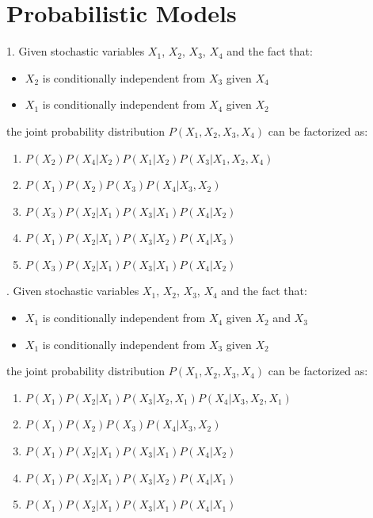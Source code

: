 \section{ Probabilistic Models}

1. Given stochastic variables $X_1$, $X_2$, $X_3$, $X_4$ and the fact that:

\begin{itemize}
    \item $X_2$ is conditionally independent from $X_3$ given $X_4$
    \item $X_1$ is conditionally independent from $X_4$ given $X_2$
\end{itemize}

\noindent the joint probability distribution $P(X_1, X_2, X_3, X_4)$ can be factorized as:
\begin{enumerate}[label=\roman*]
    \item $P(X_2)P(X_4 | X_2)P(X_1 | X_2) P(X_3 | X_1, X_2, X_4)$
    \item $P(X_1) P(X_2) P(X_3) P(X_4 | X_3, X_2)$
    \item $P(X_3) P(X_2 | X_1) P(X_3 | X_1) P(X_4 | X_2)$
    \item $P(X_1) P(X_2 | X_1) P(X_3 | X_2) P(X_4 | X_3)$
    \item $P(X_3) P(X_2 | X_1) P(X_3 | X_1) P(X_4 | X_2)$
\end{enumerate}

\newpage

. Given stochastic variables $X_1$, $X_2$, $X_3$, $X_4$ and the fact that:

\begin{itemize}
    \item $X_1$ is conditionally independent from $X_4$ given $X_2$ and $X_3$
    \item $X_1$ is conditionally independent from $X_3$ given $X_2$
\end{itemize}

\noindent the joint probability distribution $P(X_1, X_2, X_3, X_4)$ can be factorized as:
\begin{enumerate}[label=\roman*]
    \item $P(X_1)P(X_2 | X_1)P(X_3 | X_2, X_1) P(X_4 | X_3, X_2, X_1)$
    \item $P(X_1) P(X_2) P(X_3) P(X_4 | X_3, X_2)$
    \item $P(X_1) P(X_2 | X_1) P(X_3 | X_1) P(X_4 | X_2)$
    \item $P(X_1) P(X_2 | X_1) P(X_3 | X_2) P(X_4 | X_1)$
    \item $P(X_1) P(X_2 | X_1) P(X_3 | X_1) P(X_4 | X_1)$
\end{enumerate}

